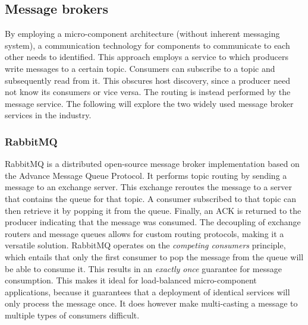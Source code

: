 \subsection{Message brokers}
By employing a micro-component architecture (without inherent messaging system), a communication technology for components to communicate to each other needs to identified. This approach employs a service to which producers write messages to a certain topic. Consumers can subscribe to a topic and subsequently read from it. This obscures host discovery, since a producer need not know its consumers or vice versa. The routing is instead performed by the message service. The following will explore the two widely used message broker services in the industry.

\subsubsection*{RabbitMQ}
RabbitMQ \cite{web:rabbitmq} is a distributed open-source message broker implementation based on the Advance Message Queue Protocol. It performs topic routing by sending a message to an exchange server. This exchange reroutes the message to a server that contains the queue for that topic. A consumer subscribed to that topic can then retrieve it by popping it from the queue. Finally, an ACK is returned to the producer indicating that the message was consumed. The decoupling of exchange routers and message queues allows for custom routing protocols, making it a versatile solution. RabbitMQ operates on the \emph{competing consumers} principle, which entails that only the first consumer to pop the message from the queue will be able to consume it. This results in an \emph{exactly once} guarantee for message consumption. This makes it ideal for load-balanced micro-component applications, because it guarantees that a deployment of identical services will only process the message once. It does however make multi-casting a message to multiple types of consumers difficult.

